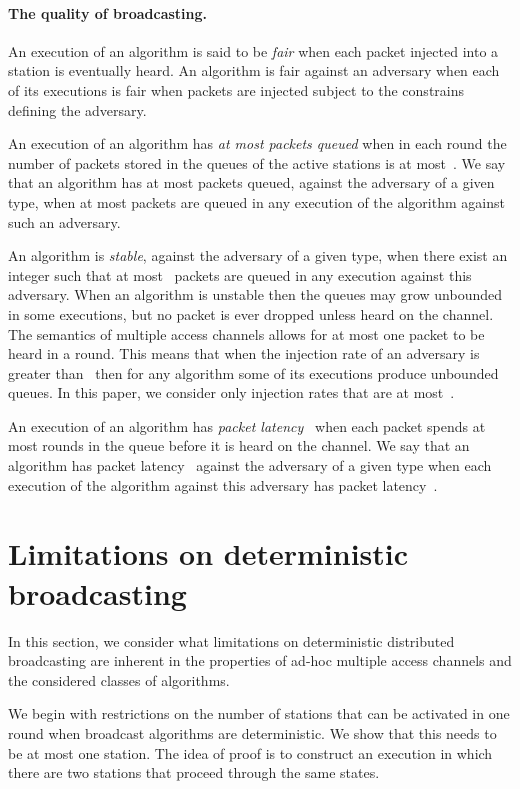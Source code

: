 \documentclass[11pt]{article}
\newcommand{\BBB}{\vspace*{-\bigskipamount}}
\newcommand{\Paragraph}[1]{\BBB\paragraph{#1}}
\begin{document}
\Paragraph{The quality of broadcasting.}




An execution of an algorithm is said to be \emph{fair} when each packet injected into a station is eventually heard.
An algorithm is fair against an adversary when each of its executions is fair when packets are injected subject to the constrains defining the adversary.

An execution of an algorithm has \emph{at most  packets queued} when in each round the number of packets stored in the queues of the active stations is at most~.
We say that an algorithm has at most  packets queued, against the adversary of a given type, when at most  packets are queued in any execution of the algorithm against such an adversary.

An algorithm is \emph{stable}, against the adversary of a given type, when there exist an integer  such that at most~ packets are queued in any execution against this adversary.
When an algorithm is unstable then the queues may grow unbounded in some executions, but no packet is ever dropped unless heard on the channel.
The semantics of multiple access channels allows for at most one packet to be heard in a round.
This means that when the injection rate of an adversary is greater than~ then for any algorithm some of its executions produce unbounded queues.
In this paper, we consider only injection rates that are at most~.

An execution of an algorithm has \emph{packet latency~} when each packet spends at most  rounds in the queue before it is heard on the channel.
We say that an algorithm has packet latency~ against the adversary of a given type when each execution of the algorithm against this adversary  has packet latency~.




\section{Limitations on deterministic broadcasting}

\label{sec:limitations}




In this section, we consider what limitations on deterministic distributed broadcasting are inherent in the properties of ad-hoc multiple access channels and the considered classes of algorithms.

We begin with restrictions on the number of stations that can be activated in one round when broadcast algorithms are deterministic.
We show that this needs to be at most one station.
The idea of proof is to construct an execution in which there are two stations that proceed through the same states.
\end{document}
